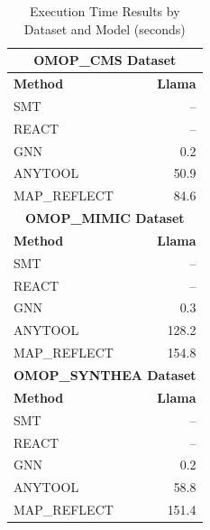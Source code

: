 \begin{table}[htbp]
\centering
\caption{Execution Time Results by Dataset and Model (seconds)}
\label{tab:execution_times}
\begin{tabular}{lr}
\toprule
\multicolumn{2}{c}{\textbf{OMOP_CMS Dataset}} \\
\midrule
\textbf{Method} & \textbf{Llama} \\
\midrule
SMT & -- \\
REACT & -- \\
GNN & 0.2 \\
ANYTOOL & 50.9 \\
MAP_REFLECT & 84.6 \\
\midrule
\multicolumn{2}{c}{\textbf{OMOP_MIMIC Dataset}} \\
\midrule
\textbf{Method} & \textbf{Llama} \\
\midrule
SMT & -- \\
REACT & -- \\
GNN & 0.3 \\
ANYTOOL & 128.2 \\
MAP_REFLECT & 154.8 \\
\midrule
\multicolumn{2}{c}{\textbf{OMOP_SYNTHEA Dataset}} \\
\midrule
\textbf{Method} & \textbf{Llama} \\
\midrule
SMT & -- \\
REACT & -- \\
GNN & 0.2 \\
ANYTOOL & 58.8 \\
MAP_REFLECT & 151.4 \\
\bottomrule
\end{tabular}
\end{table}